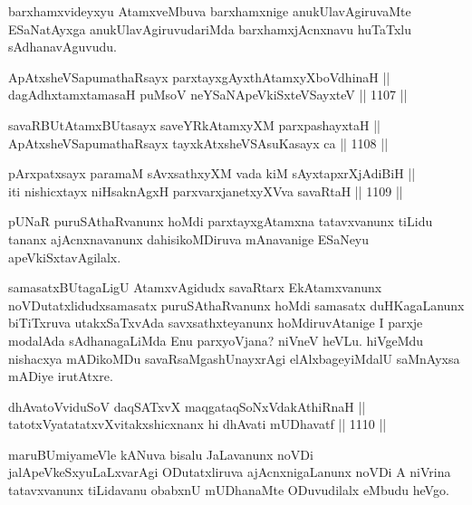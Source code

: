 
\begin{artha}
barxhamxvideyxyu AtamxveMbuva barxhamxnige anukUlavAgiruvaMte ESaNatAyxga anukUlavAgiruvudariMda barxhamxjAcnxnavu huTaTxlu sAdhanavAguvudu.
\end{artha}

\begin{shl}
ApAtxsheVSapumathaRsayx parxtayxgAyxthAtamxyXboVdhinaH || \\
dagAdhxtamxtamasaH puMsoV neYSaNA\s peVkiSxteVSayxteV \hfill || 1107 ||  
\end{shl}
				
\begin{shl}
savaRBUtAtamxBUtasayx saveYRkAtamxyXM parxpashayxtaH || \\
ApAtxsheVSapumathaRsayx tayxkAtxsheVSAsuKasayx ca \hfill || 1108 ||  
\end{shl}
				
\begin{shl}
pArxpatxsayx paramaM sAvxsathxyXM vada kiM sAyxtapxrXjAdiBiH || \\
iti nishicxtayx niHsaknAgxH parxvarxjanetxyXVva savaRtaH \hfill || 1109 ||  
\end{shl}

\begin{artha}
pUNaR puruSAthaRvanunx hoMdi parxtayxgAtamxna tatavxvanunx tiLidu tananx ajAcnxnavanunx dahisikoMDiruva mAnavanige ESaNeyu apeVkiSxtavAgilalx.
\end{artha}

\begin{artha}
samasatxBUtagaLigU AtamxvAgidudx savaRtarx EkAtamxvanunx noVDutatxlidudxsamasatx puruSAthaRvanunx hoMdi samasatx duHKagaLanunx biTiTxruva utakxSaTxvAda savxsathxteyanunx hoMdiruvAtanige I parxje modalAda sAdhanagaLiMda Enu parxyoVjana? niVneV heVLu. hiVgeMdu nishacxya mADikoMDu savaRsaMgashUnayxrAgi elAlxbageyiMdalU saMnAyxsa mADiye irutAtxre.
\end{artha}


\begin{shl}
dhAvatoV\s viduSoV daqSATxvX maqgataqSoNxVdakAthiRnaH || \\
tatotxVyatatatxvXvitakxshicxnanx hi dhAvati mUDhavatf \hfill || 1110 ||  
\end{shl}

\begin{artha}
maruBUmiyameVle kANuva bisalu JaLavanunx noVDi jalApeVkeSxyuLaLxvarAgi ODutatxliruva ajAcnxnigaLanunx noVDi A niVrina tatavxvanunx tiLidavanu obabxnU mUDhanaMte ODuvudilalx eMbudu heVgo.
\end{artha}

